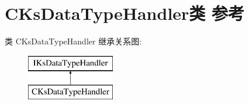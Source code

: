 \hypertarget{class_c_ks_data_type_handler}{}\section{C\+Ks\+Data\+Type\+Handler类 参考}
\label{class_c_ks_data_type_handler}
类 C\+Ks\+Data\+Type\+Handler 继承关系图\+:\begin{figure}[H]
\begin{center}
\leavevmode
\includegraphics[height=2.000000cm]{class_c_ks_data_type_handler}
\end{center}
\end{figure}
